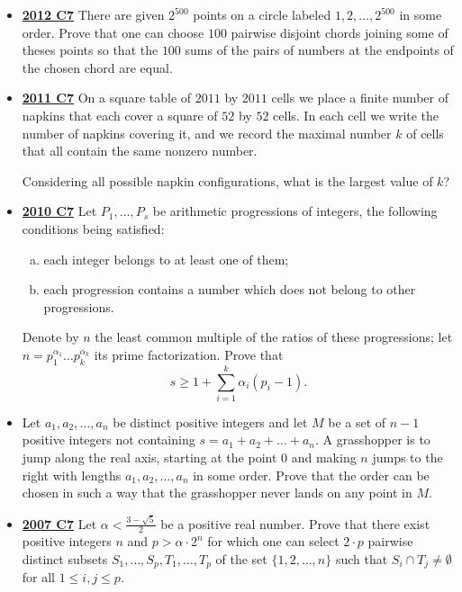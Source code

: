 \documentclass[11pt]{scrartcl}
\begin{document}
\begin{itemize}[leftmargin=*]
Let $M$ be the number of beautiful labelings, and let N be the number of ordered pairs $(x, y)$ of positive integers such that $x + y \leqslant n$ and $\gcd(x, y) = 1$. Prove that$$M = N + 1.$$
    \item \href{https://artofproblemsolving.com/community/c6h546174p3160574}{\textbf{2012 C7}} There are given $2^{500}$ points on a circle labeled $1,2,\dots ,2^{500}$ in some order. Prove that one can choose $100$ pairwise disjoint chords joining some of theses points so that the $100$ sums of the pairs of numbers at the endpoints of the chosen chord are equal.
    \item \href{https://artofproblemsolving.com/community/c6h488631p2738027}{\textbf{2011 C7}} On a square table of $2011$ by $2011$ cells we place a finite number of napkins that each cover a square of $52$ by $52$ cells. In each cell we write the number of napkins covering it, and we record the maximal number $k$ of cells that all contain the same nonzero number. 
    
    Considering all possible napkin configurations, what is the largest value of $k$?

    \newpage
    \item \href{https://artofproblemsolving.com/community/c6h418690p2362308}{\textbf{2010 C7}} Let $P_1, \dots , P_s$ be arithmetic progressions of integers, the following conditions being satisfied:
\begin{enumerate}[(a)]
    \item each integer belongs to at least one of them;
    \item  each progression contains a number which does not belong to other progressions.
\end{enumerate}
Denote by $n$ the least common multiple of the ratios of these progressions; let $n=p_1^{\alpha_1} \dots p_k^{\alpha_k}$ its prime factorization. Prove that\[s \geqslant  1 + \sum^k_{i=1} \alpha_i (p_i - 1).\]
    \item {} 	Let $ a_1, a_2, \dots , a_n$ be distinct positive integers and let $ M$ be a set of $ n - 1$ positive integers not containing $ s = a_1 + a_2 + \dots + a_n.$ A grasshopper is to jump along the real axis, starting at the point $ 0$ and making $ n$ jumps to the right with lengths $ a_1, a_2, \dots , a_n$ in some order. Prove that the order can be chosen in such a way that the grasshopper never lands on any point in $ M.$
    \item \href{https://artofproblemsolving.com/community/c6h214710p1187185}{\textbf{2007 C7}} Let $ \alpha < \frac {3 - \sqrt {5}}{2}$ be a positive real number. Prove that there exist positive integers $ n$ and $ p > \alpha \cdot 2^n$ for which one can select $ 2 \cdot p$ pairwise distinct subsets $ S_1, \dots, S_p, T_1, \dots, T_p$ of the set $ \{1,2, \dots, n\}$ such that $ S_i \cap T_j \neq \emptyset$ for all $ 1 \leqslant i,j \leqslant p$.
 

\end{itemize}
\end{document}
